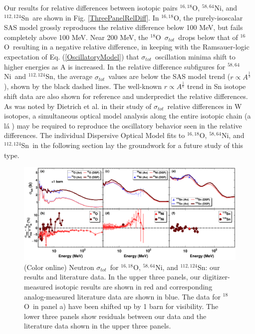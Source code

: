 \documentclass[twocolumn,secnumarabic,amssymb, nobibnotes, aps, prl,
superscriptaddress, nobalancelastpage]{revtex4}
\newcommand{\tot}{\ensuremath{\sigma_{tot}}}
\newcommand{\oSix}{\ensuremath{^{16}}O}
\newcommand{\oEight}{\ensuremath{^{18}}O}
\newcommand{\oSixEight}{\ensuremath{^{16,18}}O}
\newcommand{\niEightFour}{\ensuremath{^{58,64}}N\lowercase{i}}
\newcommand{\snTwelveFour}{\ensuremath{^{112,124}}S\lowercase{n}}
\begin{document}
Our results for relative differences between isotopic pairs \oSixEight,
\niEightFour, and \snTwelveFour\ are shown in Fig. \ref{ThreePanelRelDiff}. In
\oSixEight, the purely-isoscalar SAS model grossly reproduces the relative
difference below 100 MeV, but fails completely above 100 MeV. Near 200
MeV, the \oEight\ \tot\ drops below that of \oSix\ resulting in a negative
relative difference, in keeping with the Ramsauer-logic expectation of Eq.
(\ref{OscillatoryModel}) that \tot\ oscillation minima shift to higher
energies as A is increased. In the relative difference subfigures for 
\niEightFour\ and \snTwelveFour, the average \tot\ values are below the
SAS model trend ($r \propto A^{\frac{1}{3}}$), shown by the black dashed lines. 
The well-known $r \propto A^{\frac{1}{6}}$ trend in Sn isotope shift data 
\cite{Anselment1986} are also shown for reference and
underpredict the relative differences. As was noted by Dietrich et al. in
their study of \tot\ relative differences in W isotopes, a simultaneous optical
model analysis along the entire isotopic chain (a l\'a \cite{Mueller2011})
may be required to reproduce the oscillatory behavior seen in the relative differences.
The individual Dispersive Optical Model fits to \oSixEight, \niEightFour, and
\snTwelveFour\ in the following section lay the groundwork for a future study of
this type.
\begin{figure}[tb]
    \centering
    \includegraphics[width=\textwidth]{figures/SixPanel.png}
    \caption[Neutron \tot\ for \oSixEight, \niEightFour, and \snTwelveFour: our results and literature data]
    {(Color online) Neutron \tot\ for \oSixEight, \niEightFour, and \snTwelveFour: our results 
        and literature data.  In the upper three panels, our digitizer-measured
        isotopic results are shown in red and
        corresponding analog-measured literature data \cite{Finlay1993, 
        Perey1972, Vaughn1965, Salisbury1965, Perey1993, Dukarevich1967,
        Harper1982, Timokhov1989, Rapaport1980} are shown in blue.
        The data for \oEight\ in panel a) have been
        shifted up by 1 barn for visibility.
        The lower three panels show residuals between our data and the
        literature data shown in the upper three panels.
    }
    \label{SixPanel}
\end{figure}
\end{document}

